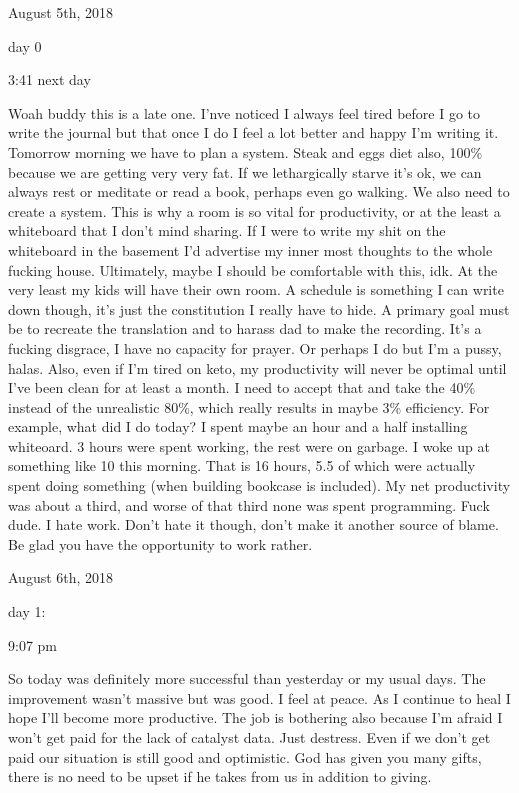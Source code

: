 \bigskip
\bigskip
August 5th, 2018

day 0

3:41 next day

Woah buddy this is a late one. I'nve noticed I always feel tired before
I go to write the journal but that once I do I feel a lot better and
happy I'm writing it. Tomorrow morning we have to plan a system. Steak
and eggs diet also, 100\% because we are getting very very fat. If we
lethargically starve it's ok, we can always rest or meditate or read a
book, perhaps even go walking. We also need to create a system. This is
why a room is so vital for productivity, or at the least a whiteboard
that I don't mind sharing. If I were to write my shit on the whiteboard
in the basement I'd advertise my inner most thoughts to the whole
fucking house. Ultimately, maybe I should be comfortable with this, idk.
At the very least my kids will have their own room. A schedule is
something I can write down though, it's just the constitution I really
have to hide. A primary goal must be to recreate the translation and to
harass dad to make the recording. It's a fucking disgrace, I have no
capacity for prayer. Or perhaps I do but I'm a pussy, halas. Also, even
if I'm tired on keto, my productivity will never be optimal until I've
been clean for at least a month. I need to accept that and take the 40\%
instead of the unrealistic 80\%, which really results in maybe 3\%
efficiency. For example, what did I do today? I spent maybe an hour and
a half installing whiteoard. 3 hours were spent working, the rest were
on garbage. I woke up at something like 10 this morning. That is 16
hours, 5.5 of which were actually spent doing something (when building
bookcase is included). My net productivity was about a third, and worse
of that third none was spent programming. Fuck dude. I hate work. Don't
hate it though, don't make it another source of blame. Be glad you have
the opportunity to work rather.

\bigskip
\bigskip
August 6th, 2018

day 1:

9:07 pm

So today was definitely more successful than yesterday or my usual days.
The improvement wasn't massive but was good. I feel at peace. As I
continue to heal I hope I'll become more productive. The job is
bothering also because I'm afraid I won't get paid for the lack of
catalyst data. Just destress. Even if we don't get paid our situation is
still good and optimistic. God has given you many gifts, there is no
need to be upset if he takes from us in addition to giving.

